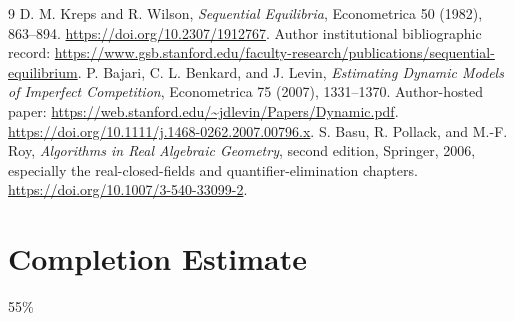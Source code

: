 \documentclass[11pt]{article}
\theoremstyle{remark}\newtheorem{remark}[theorem]{Remark}
\begin{document}
\begin{thebibliography}{9}
 D. M. Kreps and R. Wilson, \emph{Sequential Equilibria}, Econometrica 50 (1982), 863--894. \url{https://doi.org/10.2307/1912767}. Author institutional bibliographic record: \url{https://www.gsb.stanford.edu/faculty-research/publications/sequential-equilibrium}.
 P. Bajari, C. L. Benkard, and J. Levin, \emph{Estimating Dynamic Models of Imperfect Competition}, Econometrica 75 (2007), 1331--1370. Author-hosted paper: \url{https://web.stanford.edu/~jdlevin/Papers/Dynamic.pdf}. \url{https://doi.org/10.1111/j.1468-0262.2007.00796.x}.
 S. Basu, R. Pollack, and M.-F. Roy, \emph{Algorithms in Real Algebraic Geometry}, second edition, Springer, 2006, especially the real-closed-fields and quantifier-elimination chapters. \url{https://doi.org/10.1007/3-540-33099-2}.
\end{thebibliography}

\section{Completion Estimate}
55\%
\end{document}
